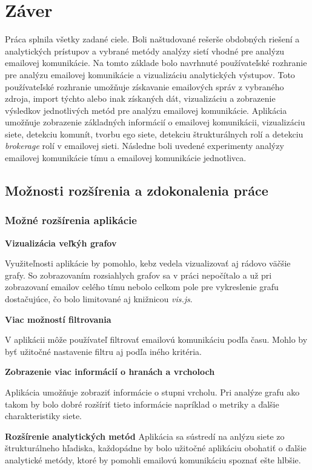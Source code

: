 \documentclass[slovak,master,public,dept460,male,cpdeclaration,oneside]{diploma}
\begin{document}
\section{Záver}
Práca splnila všetky zadané ciele. Boli naštudované rešerše obdobných riešení a analytických prístupov a vybrané metódy analýzy sietí vhodné pre analýzu emailovej komunikácie. Na tomto základe bolo navrhnuté používateľské rozhranie pre analýzu emailovej komunikácie a vizualizáciu analytických výstupov. Toto používateľské rozhranie umožňuje získavanie emailových správ z vybraného zdroja, import týchto alebo inak získaných dát, vizualizáciu a zobrazenie výsledkov jednotlivých metód pre analýzu emailovej komunikácie. Aplikácia umožňuje zobrazenie základných informácií o emailovej komunikácii, vizualizáciu siete, detekciu komunít, tvorbu ego siete, detekciu štrukturálnych rolí a detekciu \textit{brokerage} rolí v emailovej sieti. Následne boli uvedené experimenty analýzy emailovej komunikácie tímu a emailovej komunikácie jednotlivca.

\subsection{Možnosti rozšírenia a zdokonalenia práce}

\subsubsection{Možné rozšírenia aplikácie}

\begin{description}
\item \textbf{Vizualizácia veľkýh grafov}


Využiteľnosti aplikácie by pomohlo, kebz vedela vizualizovať aj rádovo väčšie grafy. So zobrazovaním rozsiahlych grafov sa v práci nepočítalo a už pri zobrazovaní emailov celého  tímu nebolo celkom pole pre vykreslenie grafu dostačujúce, čo bolo limitované aj knižnicou \textit{vis.js}.


\item \textbf{Viac možností filtrovania}

V aplikácii môže používateľ filtrovať emailovú komunikáciu podľa času. Mohlo by byť užitočné nastavenie filtru aj podľa iného kritéria.


\item \textbf{Zobrazenie viac informácií o hranách a vrcholoch}

Aplikácia umožňuje zobraziť informácie o stupni vrcholu. Pri analýze grafu ako takom by bolo dobré rozšíriť tieto informácie napríklad o metriky a ďalšie charakteristiky siete.

\item \textbf{Rozšírenie analytických metód}
Aplikácia sa sústredí na anlýzu siete zo štrukturálneho hľadiska, každopádne by bolo užitočné aplikáciu obohatiť o ďalšie analytické metódy, ktoré by pomohli emailovú komunikáciu spoznať ešte hlbšie.

\end{description}
\end{document}
